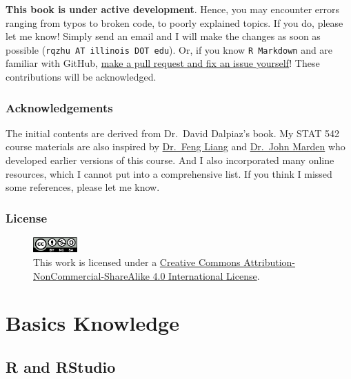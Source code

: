 \documentclass[
]{book}
\theoremstyle{definition}
\theoremstyle{definition}
\theoremstyle{definition}
\theoremstyle{definition}
\theoremstyle{remark}
\begin{document}
\textbf{This book is under active development}. Hence, you may encounter errors ranging from typos to broken code, to poorly explained topics. If you do, please let me know! Simply send an email and I will make the changes as soon as possible (\texttt{rqzhu\ AT\ illinois\ DOT\ edu}). Or, if you know \texttt{R\ Markdown} and are familiar with GitHub, \href{https://github.com/teazrq/SLWR}{make a pull request and fix an issue yourself}! These contributions will be acknowledged.

\hypertarget{acknowledgements}{%
\section*{Acknowledgements}\label{acknowledgements}}

The initial contents are derived from Dr.~David Dalpiaz's book. My STAT 542 course materials are also inspired by \href{https://stat.illinois.edu/directory/profile/liangf}{Dr.~Feng Liang} and \href{https://stat.illinois.edu/directory/profile/jimarden}{Dr.~John Marden} who developed earlier versions of this course. And I also incorporated many online resources, which I cannot put into a comprehensive list. If you think I missed some references, please let me know.

\hypertarget{license}{%
\section*{License}\label{license}}

\begin{figure}
\centering
\includegraphics[width=0.15\textwidth,height=\textheight]{images/cc.png}
\caption{This work is licensed under a \href{http://creativecommons.org/licenses/by-nc-sa/4.0/}{Creative Commons Attribution-NonCommercial-ShareAlike 4.0 International License}.}
\end{figure}

\hypertarget{part-basics-knowledge}{%
\part{Basics Knowledge}\label{part-basics-knowledge}}

\hypertarget{r-and-rstudio}{%
\chapter{R and RStudio}\label{r-and-rstudio}}
\end{document}

